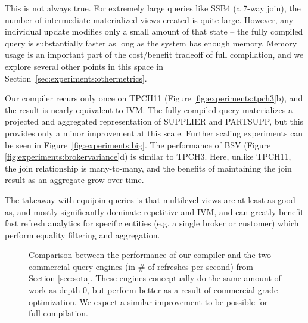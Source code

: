 This is not always true.  For extremely large queries like SSB4 (a 7-way join), the number of intermediate materialized views created is quite large.  However, any individual update modifies only a small amount of that state -- the fully compiled query is substantially faster as long as the system has enough memory.    Memory usage is an important part of the cost/benefit tradeoff of full compilation, and we explore several other points in this space in Section~\ref{sec:experiments:othermetrics}.  

Our compiler recurs only once on TPCH11 (Figure \ref{fig:experiments:tpch3}b), and the result is nearly equivalent to IVM.  The fully compiled query materializes a projected and aggregated representation of SUPPLIER and PARTSUPP, but this provides only a minor improvement at this scale. Further scaling experiments can be seen in Figure~\ref{fig:experiments:big}.
The performance of BSV (Figure \ref{fig:experiments:brokervariance}d) is similar to TPCH3. Here, unlike TPCH11, the join relationship is many-to-many, and the benefits of maintaining the join result as an aggregate grow over time.

The takeaway with equijoin queries is that multilevel views are at least as good as, and mostly significantly dominate repetitive and IVM, and can greatly benefit fast refresh analytics for specific entities (e.g. a single broker or customer) which perform equality filtering and aggregation.

\begin{figure}
\begin{center}
\resizebox{3.3in}{!}{

}
\caption{Comparison between the performance of our compiler and the two commercial query engines (in \# of refreshes per second) from Section \ref{sec:sota}.  These engines conceptually do the same amount of work as depth-0, but perform better as a result of commercial-grade optimization.  We expect a similar improvement to be possible for full compilation.}
\label{fig:experiments:enginesVsDBT}
\vspace*{-0.3in}
\end{center}
\end{figure}

